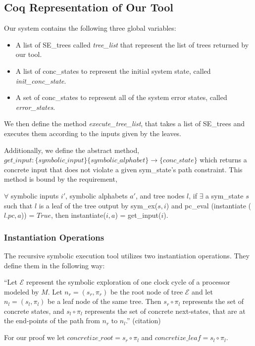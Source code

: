 \subsection{Coq Representation of Our Tool}
Our system contains the following three global variables:
\begin{itemize}
\item A list of SE\_trees called \textit{tree\_list} that represent the list of trees returned by our tool.
\item A list of conc\_states to represent the initial system state, called \textit{init\_conc\_state}.
\item A set of conc\_states to represent all of the system error states, called \textit{error\_states}.
\end{itemize}

We then define the method \textit{execute\_tree\_list}, that takes a list of SE\_trees and executes them according to the inputs given by the leaves.

Additionally, we define the abstract method, $ get\_input : \{symbolic\_input\} \{symbolic\_alphabet\} \rightarrow \{conc\_state\}$ which returns a concrete input that does not violate a given sym\_state's path constraint.
This method is bound by the requirement,
\begin{axiom}
$ \forall$ symbolic inputs $i'$, symbolic alphabets $a'$, and tree nodes $l$, 
if $\exists$ a sym\_state $s$  such that
$ l$ is a leaf of the tree output by sym\_ex($s, i$) and 
pc\_eval (instantiate ($l.pc, a$)) = $True$, then
instantiate($i, a$) = get\_input($i$).
\end{axiom}

\subsubsection{Instantiation Operations}
The recursive symbolic execution tool utilizes two instantiation operations. 
They define them in the following way: 

``Let $\mathcal{E}$ represent the symbolic exploration of one clock cycle of a processor modeled by $M$. Let $n_r = (s_r,\pi_r)$ be the root node of tree $\mathcal{E}$ and let $n_l = (s_l,\pi_l)$ be a leaf node of the same tree. 
Then $s_r \circ \pi_l$ represents the set of concrete states, and $s_l \circ \pi_l$ represents the set of concrete next-states, that are at the end-points of the path from $n_r$ to $n_l$.'' (citation)

For our proof we let $concretize\_root=  s_r \circ \pi_l$ and $concretize\_leaf =  s_l \circ \pi_l$.

